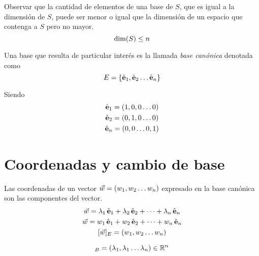 Observar que la cantidad de elementos de una base de $S$, que es igual a la dimensión de $S$, puede ser menor o igual que la dimensión de un espacio que contenga a $S$ pero no mayor.
\begin{equation*}
    \operatorname{dim}(S)\leq n
\end{equation*}

Una base que resulta de particular interés es la llamada \emph{base canónica} denotada como
\begin{equation*}
    E = { \left\{ {\hat{\textbf{e}}_1,\hat{\textbf{e}}_2 \dots \hat{\textbf{e}}_n} \right\} }
\end{equation*}

Siendo
\begin{gather*}
    \hat{\textbf{e}}_1 = (1,0,0 \dots 0)
    \\
    \hat{\textbf{e}}_2 = (0,1,0 \dots 0)
    \\
    \hat{\textbf{e}}_n = (0,0 \dots 0,1)
\end{gather*}


\section{Coordenadas y cambio de base}

Las coordenadas de un vector $\Vec{w}=(w_1,w_2 \dots w_n)$ expresado en la base canónica son las componentes del vector.
\begin{gather*}
    \Vec{w} = \lambda_1 \, \hat{\textbf{e}}_1 + \lambda_2 \, \hat{\textbf{e}}_2 + \dots + \lambda_n \, \hat{\textbf{e}}_n
    \\
    \Vec{w} = w_1 \, \hat{\textbf{e}}_1 + w_2 \, \hat{\textbf{e}}_2 + \dots + w_n \, \hat{\textbf{e}}_n
    \\
    [\Vec{w}]_E = (w_1,w_2 \dots w_n)
\end{gather*}

\begin{mdframed}[style=DefinitionFrame]
    \begin{defn}
    \end{defn}
    \begin{equation*}
        [\Vec{w}]_B = (\lambda_1,\lambda_1 \dots \lambda_\nth) \in \setR^\nth
    \end{equation*}
\end{mdframed}

